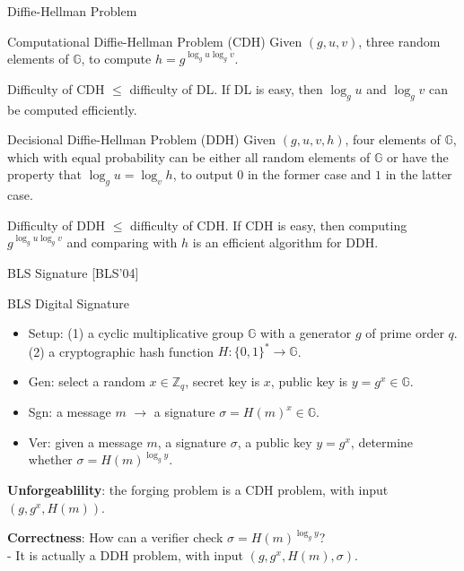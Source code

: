 \documentclass[10pt]{beamer}
\begin{document}
\begin{frame}{Diffie-Hellman Problem}
\begin{block}{Computational Diffie-Hellman Problem (CDH)}
    Given $(g, u, v)$, three random elements of $\mathbb{G}$, to compute $h=g^{\log_g u \log_g v}$. 
\end{block}
\pause 
Difficulty of CDH $\le$ difficulty of DL. If DL is easy, then $\log_g u$
 and $\log_g v$ can be computed efficiently. \pause

\begin{block}{Decisional Diffie-Hellman Problem (DDH)}
    Given $(g, u, v, h)$, four elements of $\mathbb{G}$, which with equal probability can be either all random elements of $\mathbb{G}$ or have the property that $\log_g u = \log_v h$, to output $0$ in the former case and $1$ in the latter case. 
\end{block}
\pause
Difficulty of DDH $\le$ difficulty of CDH. If CDH is easy, then computing $g^{\log_g u \log_g v}$ and comparing with $h$ is an efficient algorithm for DDH.  

\end{frame}

\begin{frame}{BLS Signature [BLS'04]} 
\begin{block}{BLS Digital Signature}
    \begin{itemize}
        \item Setup: (1) a cyclic multiplicative group $\mathbb{G}$ with a generator $g$ of prime order $q$. (2) a cryptographic hash function $H:\{0,1\}^\ast \to \mathbb{G}$. 
        \item Gen: select a random $x\in \mathbb{Z}_{q}$, secret key is $x$, public key is $y=g^x \in \mathbb{G}$. 
        \item Sgn: a message $m$ $\to$ a signature $\sigma = H(m)^x \in \mathbb{G}$. 
        \item Ver: given a message $m$, a signature $\sigma$, a public key $y=g^x$, determine whether $\sigma = H(m)^{\log_g y}$.   
    \end{itemize}
\end{block} \pause
\textbf{Unforgeablility}: the forging problem is a CDH problem, with input $(g, g^x, H(m))$.  \\ \pause

\textbf{Correctness}: How can a verifier check $\sigma = H(m)^{\log_g y}$? \\
- It is actually a DDH problem, with input $(g, g^x, H(m), \sigma)$. 
\end{frame}
\end{document}
